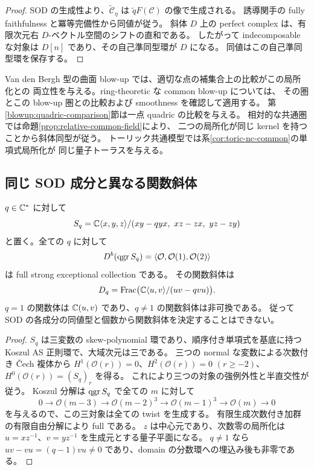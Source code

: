 \begin{proof}
SOD の生成性より、$\widetilde{\mathcal C}_\eta$ は
$\widetilde qF(\mathcal C)$ の像で生成される。
誘導関手の fully faithfulness と冪等完備性から同値が従う。
斜体 $D$ 上の perfect complex は、有限次元右 $D$-ベクトル空間のシフトの直和である。
したがって indecomposable な対象は $D[n]$ であり、その自己準同型環が $D$ になる。
同値はこの自己準同型環を保存する。
\end{proof}

Van den Bergh 型の曲面 blow-up では、適切な点の補集合上の比較がこの局所化との
両立性を与える。ring-theoretic な common blow-up については、
その圏とこの blow-up 圏との比較および smoothness を確認して適用する。
第\ref{blowup:quadric-comparison}節は一点 quadric の比較を与える。
相対的な共通圏では命題\ref{prop:relative-common-field}により、
二つの局所化が同じ kernel を持つことから斜体同型が従う。
トーリック共通模型では系\ref{cor:toric-nc-common}の単項式局所化が
同じ量子トーラスを与える。

\subsection{同じ SOD 成分と異なる関数斜体}

\begin{proposition}\label{prop:sod-does-not-determine-field}
$q\in\mathbb C^*$ に対して
\[
 S_q=\CC\langle x,y,z\rangle/(xy-qyx,\ xz-zx,\ yz-zy)
\]
と置く。全ての $q$ に対して
\[
 D^b(\operatorname{qgr} S_q)=\langle\mathcal O,\mathcal O(1),\mathcal O(2)\rangle
\]
は full strong exceptional collection である。
その関数斜体は
\[
 D_q=\operatorname{Frac}\bigl(\mathbb C\langle u,v\rangle/(uv-qvu)\bigr).
\]
$q=1$ の関数体は $\mathbb C(u,v)$ であり、$q\ne1$ の関数斜体は非可換である。
従って SOD の各成分の同値型と個数から関数斜体を決定することはできない。
\end{proposition}

\begin{proof}
$S_q$ は三変数の skew-polynomial 環であり、順序付き単項式を基底に持つ
Koszul AS 正則環で、大域次元は三である。
三つの normal な変数による次数付き \v{C}ech 複体から
$H^1(\mathcal O(r))=0$、$H^2(\mathcal O(r))=0$ $(r\ge-2)$、
$H^0(\mathcal O(r))=(S_q)_r$ を得る。
これにより三つの対象の強例外性と半直交性が従う。
Koszul 分解は $\operatorname{qgr} S_q$ で全ての $m$ に対して
\[
 0\longrightarrow\mathcal O(m-3)\longrightarrow\mathcal O(m-2)^3
 \longrightarrow\mathcal O(m-1)^3\longrightarrow\mathcal O(m)\longrightarrow0
\]
を与えるので、この三対象は全ての twist を生成する。
有限生成次数付き加群の有限自由分解により full である。
$z$ は中心元であり、次数零の局所化は
$u=xz^{-1}$、$v=yz^{-1}$ を生成元とする量子平面になる。
$q\ne1$ なら $uv-vu=(q-1)vu\ne0$ であり、domain の分数環への埋込み後も非零である。
\end{proof}

